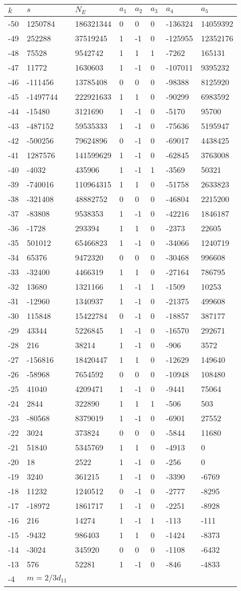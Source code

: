 \documentclass{amsart}
\begin{document}
\begin{longtable}{|l|l|l|lllll|}
\hline
$k$ & $s$ & $N_E$ & $a_1$ & $a_2$ & $a_3$ & $a_4$ & $a_5$\\
\hline
-50&1250784&186321344&0&0&0&-136324&14059392\\
-49&252288&37519245&1&-1&0&-125955&12352176\\
-48&75528&9542742&1&1&1&-7262&165131\\
-47&11772&1630603&1&-1&0&-107011&9395232\\
-46&-111456&13785408&0&0&0&-98388&8125920\\
-45&-1497744&222921633&1&1&0&-90299&6983592\\
-44&-15480&3121690&1&-1&0&-5170&95700\\
-43&-487152&59535333&1&-1&0&-75636&5195947\\
-42&-500256&79624896&0&-1&0&-69017&4438425\\
-41&1287576&141599629&1&-1&0&-62845&3763008\\
-40&-4032&435906&1&-1&1&-3569&50321\\
-39&-740016&110964315&1&1&0&-51758&2633823\\
-38&-321408&48882752&0&0&0&-46804&2215200\\
-37&-83808&9538353&1&-1&0&-42216&1846187\\
-36&-1728&293394&1&1&0&-2373&22605\\
-35&501012&65466823&1&-1&0&-34066&1240719\\
-34&65376&9472320&0&0&0&-30468&996608\\
-33&-32400&4466319&1&1&0&-27164&786795\\
-32&13680&1321166&1&-1&1&-1509&10253\\
-31&-12960&1340937&1&-1&0&-21375&499608\\
-30&115848&15422784&0&-1&0&-18857&387177\\
-29&43344&5226845&1&-1&0&-16570&292671\\
-28&216&38214&1&-1&0&-906&3572\\
-27&-156816&18420447&1&1&0&-12629&149640\\
-26&-58968&7654592&0&0&0&-10948&108480\\
-25&41040&4209471&1&-1&0&-9441&75064\\
-24&2844&322890&1&1&1&-506&503\\
-23&-80568&8379019&1&-1&0&-6901&27552\\
-22&3024&373824&0&0&0&-5844&11680\\
-21&51840&5345769&1&1&0&-4913&0\\
-20&18&2522&1&-1&0&-256&0\\
-19&3240&361215&1&-1&0&-3390&-6769\\
-18&11232&1240512&0&-1&0&-2777&-8295\\
-17&-18972&1861717&1&-1&0&-2251&-8928\\
-16&216&14274&1&-1&1&-113&-111\\
-15&-9432&986403&1&1&0&-1424&-8373\\
-14&-3024&345920&0&0&0&-1108&-6432\\
-13&576&52281&1&-1&0&-846&-4833\\
-4&$m=2/3d_{11}$&&\multicolumn{5}{c|}{}\\
\hline
\end{longtable}
\end{document}
